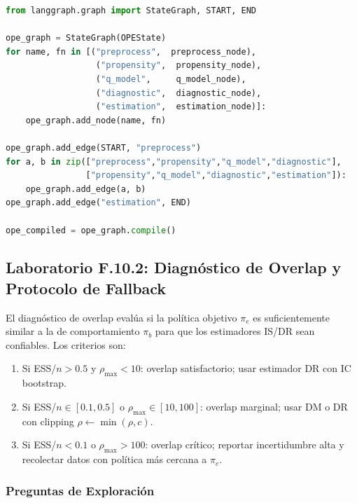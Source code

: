 \begin{lstlisting}[language=python, caption={Construcción y ejecución del grafo LangGraph.}]
from langgraph.graph import StateGraph, START, END

ope_graph = StateGraph(OPEState)
for name, fn in [("preprocess",  preprocess_node),
                  ("propensity",  propensity_node),
                  ("q_model",     q_model_node),
                  ("diagnostic",  diagnostic_node),
                  ("estimation",  estimation_node)]:
    ope_graph.add_node(name, fn)

ope_graph.add_edge(START, "preprocess")
for a, b in zip(["preprocess","propensity","q_model","diagnostic"],
                ["propensity","q_model","diagnostic","estimation"]):
    ope_graph.add_edge(a, b)
ope_graph.add_edge("estimation", END)

ope_compiled = ope_graph.compile()
\end{lstlisting}

\subsection*{Laboratorio F.10.2: Diagnóstico de Overlap y Protocolo de Fallback}

El diagnóstico de overlap evalúa si la política objetivo $\pi_e$ es
suficientemente similar a la de comportamiento $\pi_b$ para que los
estimadores IS/DR sean confiables. Los criterios son:

\begin{enumerate}
    \item Si ESS/$n > 0.5$ y $\rho_{\max} < 10$: overlap satisfactorio;
          usar estimador DR con IC bootstrap.
    \item Si ESS/$n \in [0.1, 0.5]$ o $\rho_{\max} \in [10, 100]$: overlap
          marginal; usar DM o DR con clipping $\rho \leftarrow \min(\rho, c)$.
    \item Si ESS/$n < 0.1$ o $\rho_{\max} > 100$: overlap crítico; reportar
          incertidumbre alta y recolectar datos con política más cercana a $\pi_e$.
\end{enumerate}

\subsubsection*{Preguntas de Exploración}

